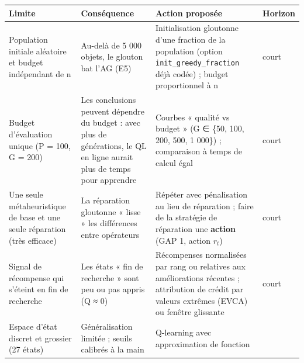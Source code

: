 \documentclass[
  french,
  11pt,
  a4paper,
]{article}
\newcounter{none} %
\begin{document}
{\def\LTcaptype{none} %
\begin{longtable}[]{@{}
  >{\raggedright\arraybackslash}p{}
  >{\raggedright\arraybackslash}p{}
  >{\raggedright\arraybackslash}p{}
  >{\raggedright\arraybackslash}p{}@{}}
\toprule\noalign{}
\begin{minipage}[b]{\linewidth}\raggedright
Limite
\end{minipage} & \begin{minipage}[b]{\linewidth}\raggedright
Conséquence
\end{minipage} & \begin{minipage}[b]{\linewidth}\raggedright
Action proposée
\end{minipage} & \begin{minipage}[b]{\linewidth}\raggedright
Horizon
\end{minipage} \\
\midrule\noalign{}
\endhead
\bottomrule\noalign{}
\endlastfoot
Population initiale aléatoire et budget indépendant de n & Au-delà de 5
000 objets, le glouton bat l'AG (E5) & Initialisation gloutonne d'une
fraction de la population (option \texttt{init\_greedy\_fraction} déjà
codée) ; budget proportionnel à n & court \\
Budget d'évaluation unique (P = 100, G = 200) & Les conclusions peuvent
dépendre du budget : avec plus de générations, le QL en ligne aurait
plus de temps pour apprendre & Courbes « qualité vs budget » (G ∈ \{50,
100, 200, 500, 1 000\}) ; comparaison à temps de calcul égal & court \\
Une seule métaheuristique de base et une seule réparation (très
efficace) & La réparation gloutonne « lisse » les différences entre
opérateurs & Répéter avec pénalisation au lieu de réparation ; faire de
la stratégie de réparation une \textbf{action} (GAP 1, action \(r_t\)) &
court \\
Signal de récompense qui s'éteint en fin de recherche & Les états « fin
de recherche » sont peu ou pas appris (Q ≈ 0) & Récompenses normalisées
par rang ou relatives aux améliorations récentes ; attribution de crédit
par valeurs extrêmes (EVCA) ou fenêtre glissante
\autocite{karimi-mamaghan_machine_2022} & court \\
Espace d'état discret et grossier (27 états) & Généralisation limitée ;
seuils calibrés à la main & Q-learning avec approximation de fonction

\end{longtable}}
\end{document}
